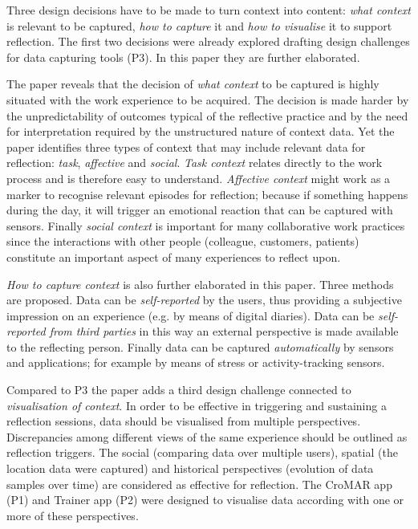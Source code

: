 Three design decisions have to be made to turn context into content: \emph{what context} is relevant to be captured, \emph{how to capture} it and \emph{how to visualise} it to support reflection. The first two decisions were already explored drafting design challenges for data capturing tools (P3). In this paper they are further elaborated.

The paper reveals that the decision of \emph{what context} to be captured is highly situated with the work experience to be acquired. The decision is made harder by the unpredictability of outcomes typical of the reflective practice and by the need for interpretation required by the unstructured nature of context data. Yet the paper identifies three types of context that may include relevant data for reflection: \emph{task}, \emph{affective} and \emph{social}. \emph{Task context} relates directly to the work process and is therefore easy to understand. \emph{Affective context} might work as a marker to recognise relevant episodes for reflection; because if something happens during the day, it will trigger an emotional reaction that can be captured with sensors. Finally \emph{social context} is important for many collaborative work practices since the interactions with other people (colleague, customers, patients) constitute an important aspect of many experiences to reflect upon.

\emph{How to capture context} is also further elaborated in this paper. Three methods are proposed. Data can be \emph{self-reported} by the users, thus providing a subjective impression on an experience (e.g. by means of digital diaries). Data can be \emph{self-reported from third parties} in this way an external perspective is made available to the reflecting person. Finally data can be captured \emph{automatically} by sensors and applications; for example by means of stress or activity-tracking sensors.

Compared to P3 the paper adds a third design challenge connected to \emph{visualisation of context}. In order to be effective in triggering and sustaining a reflection sessions, data should be visualised from multiple perspectives. Discrepancies among different views of the same experience should be outlined as reflection triggers. The social (comparing data over multiple users), spatial (the location data were captured) and historical perspectives (evolution of data samples over time) are considered as effective for reflection. The CroMAR app (P1) and Trainer app (P2) were designed to visualise data according with one or more of these perspectives.

